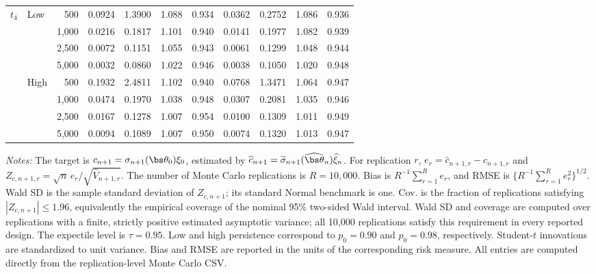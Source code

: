 \begin{table}[!p]
\begin{tabular}{llr*{8}{r}}
\addlinespace[3pt]
$t_4$ & Low & 500 & 0.0924 & 1.3900 & 1.088 & 0.934 & 0.0362 & 0.2752 & 1.086 & 0.936\\
 &  & 1,000 & 0.0216 & 0.1817 & 1.101 & 0.940 & 0.0141 & 0.1977 & 1.082 & 0.939\\
 &  & 2,500 & 0.0072 & 0.1151 & 1.055 & 0.943 & 0.0061 & 0.1299 & 1.048 & 0.944\\
 &  & 5,000 & 0.0032 & 0.0860 & 1.022 & 0.946 & 0.0038 & 0.1050 & 1.020 & 0.948\\
\addlinespace[1pt]
 & High & 500 & 0.1932 & 2.4811 & 1.102 & 0.940 & 0.0768 & 1.3471 & 1.064 & 0.947\\
 &  & 1,000 & 0.0474 & 0.1970 & 1.038 & 0.948 & 0.0307 & 0.2081 & 1.035 & 0.946\\
 &  & 2,500 & 0.0167 & 0.1278 & 1.007 & 0.954 & 0.0100 & 0.1309 & 1.011 & 0.949\\
 &  & 5,000 & 0.0094 & 0.1089 & 1.007 & 0.950 & 0.0074 & 0.1320 & 1.013 & 0.947\\
\bottomrule
\end{tabular}
\begin{minipage}{0.98\textwidth}\footnotesize\vspace{4pt}
\textit{Notes:} The target is $c_{n+1}=\sigma_{n+1}(\bs\theta_0)\xi_0$, estimated by $\widehat c_{n+1}=\widetilde\sigma_{n+1}(\widehat{\bs\theta}_n)\widehat\xi_n$. For replication $r$, $e_r=\widehat c_{n+1,r}-c_{n+1,r}$ and $Z_{c,n+1,r}=\sqrt n\,e_r/\sqrt{\widehat V_{n+1,r}}$. The number of Monte Carlo replications is $R=10{,}000$. Bias is $R^{-1}\sum_{r=1}^{R}e_r$, and RMSE is $\{R^{-1}\sum_{r=1}^{R}e_r^2\}^{1/2}$. Wald SD is the sample standard deviation of $Z_{c,n+1}$; its standard Normal benchmark is one. Cov. is the fraction of replications satisfying $|Z_{c,n+1}|\leq 1.96$, equivalently the empirical coverage of the nominal 95\% two-sided Wald interval. Wald SD and coverage are computed over replications with a finite, strictly positive estimated asymptotic variance; all 10,000 replications satisfy this requirement in every reported design. The expectile level is $\tau=0.95$. Low and high persistence correspond to $p_0=0.90$ and $p_0=0.98$, respectively. Student-$t$ innovations are standardized to unit variance. Bias and RMSE are reported in the units of the corresponding risk measure. All entries are computed directly from the replication-level Monte Carlo CSV.
\end{minipage}
\end{table}
